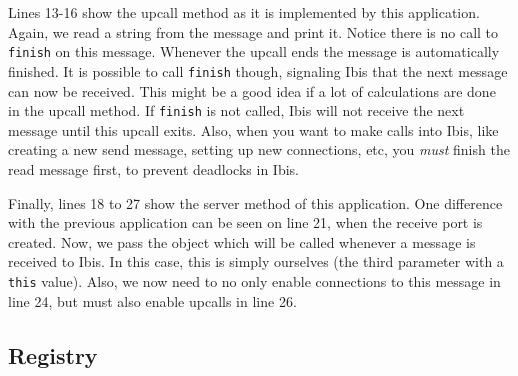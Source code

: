 Lines 13-16 show the upcall method as it is implemented by this
application. Again, we read a string from the message and print it.
Notice there is no call to \texttt{finish} on this message. Whenever the
upcall ends the message is automatically finished. It is possible to
call \texttt{finish} though, signaling Ibis that the next message can now be
received. This might be a good idea if a lot of calculations are done in
the upcall method. If \texttt{finish} is not called, Ibis will not
receive the next message until this upcall exits. Also, when you want
to make calls into Ibis, like creating a new send message, setting up new
connections, etc, you \emph{must} finish the read message first, to
prevent deadlocks in Ibis.

Finally, lines 18 to 27 show the server method of this application. One
difference with the previous application can be seen on line 21, when
the receive port is created. Now, we pass the object which will be
called whenever a message is received  to Ibis. In this case, this is
simply ourselves (the third parameter with a \texttt{this} value). Also,
we now need to no only enable connections to this message in line 24,
but must also enable upcalls in line 26.

\subsection{Registry}

